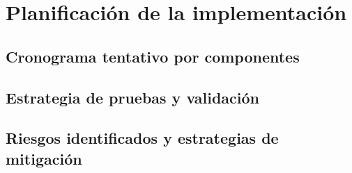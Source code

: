 \section{Planificación de la implementación}
\subsection{Cronograma tentativo por componentes}
\subsection{Estrategia de pruebas y validación}
\subsection{Riesgos identificados y estrategias de mitigación}